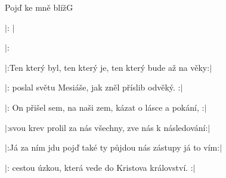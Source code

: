 \begin{song}{Pojď ke mně blíž}{G}{}

\begin{SBVerse}

$|$: $|$

$|$: 

\end{SBVerse}

\begin{SBVerse}

$|$:Ten který byl, ten který je, ten který bude až na věky:$|$

$|$: poslal světu Mesiáše, jak zněl příslib odvěký. :$|$

\end{SBVerse}

\begin{SBVerse}

$|$: On přišel sem, na naši zem, kázat o lásce a pokání, :$|$

$|$:svou krev prolil za nás všechny, zve nás k následování:$|$

\end{SBVerse}

\begin{SBVerse}

$|$:Já za ním jdu pojď také ty půjdou nás zástupy já to vím:$|$

$|$: cestou úzkou, která vede do Kristova království. :$|$

\end{SBVerse}

\end{song}
\pagebreak
